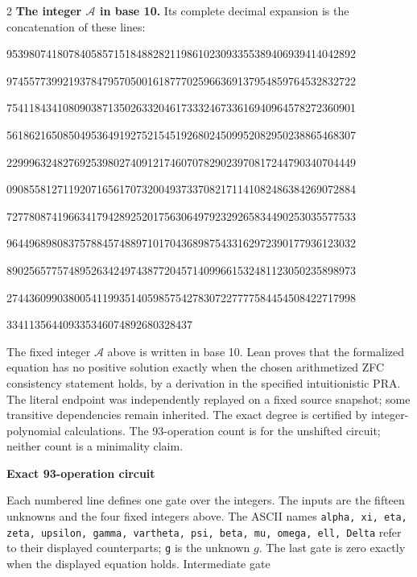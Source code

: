 \documentclass[10pt]{article}
\begin{document}
\begin{multicols}{2}
\textbf{The integer $\mathcal A$ in base 10.}
Its complete decimal expansion is the concatenation of these lines:\par
\begingroup\fontsize{7.7}{8.2}\selectfont{}\par
95398074180784058571518488282119861023093355389406939414042892\par
97455773992193784795705001618777025966369137954859764532832722\par
75411843410809038713502633204617333246733616940964578272360901\par
56186216508504953649192752154519268024509952082950238865468307\par
22999632482769253980274091217460707829023970817244790340704449\par
09085581271192071656170732004937337082171141082486384269072884\par
72778087419663417942892520175630649792329265834490253035577533\par
96449689808375788457488971017043689875433162972390177936123032\par
89025657757489526342497438772045714099661532481123050235898973\par
27443609903800541199351405985754278307227777584454508422717998\par
334113564409335346074892680328437\par
\endgroup
\normalfont\fontsize{7.7}{8.2}\selectfont
The fixed integer $\mathcal A$ above is written in base 10. Lean proves that
the formalized equation has no positive solution exactly when the chosen
arithmetized ZFC consistency statement holds, by a derivation in the specified
intuitionistic PRA. The literal endpoint was independently replayed on a fixed
source snapshot; some transitive dependencies remain inherited. The exact
degree is certified by integer-polynomial calculations. The 93-operation count
is for the unshifted circuit; neither count is a minimality claim.
\end{multicols}
\clearpage
\begin{center}{\large\bfseries Exact 93-operation circuit}\end{center}
Each numbered line defines one gate over the integers. The inputs are the
fifteen unknowns and the four fixed integers above. The ASCII names
\texttt{alpha, xi, eta, zeta, upsilon, gamma, vartheta, psi, beta, mu, omega, ell, Delta}
refer to their displayed counterparts; \texttt{g} is the unknown $g$. The last
gate is zero exactly when the displayed equation holds. Intermediate gate
\end{document}
